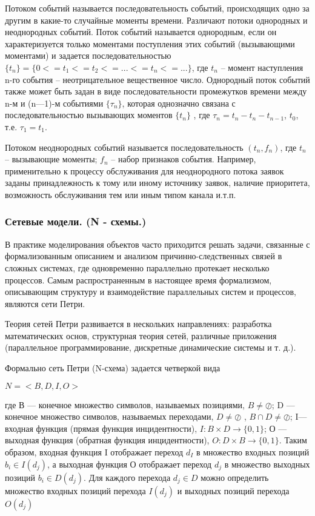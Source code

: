   Потоком событий называется последовательность событий, происходящих одно за другим в какие-то случайные моменты времени. Различают потоки однородных и неоднородных событий. Поток событий называется однородным, если он характеризуется только моментами поступления этих событий (вызывающими моментами) и задается последовательностью $\{t_{n}\} = \{0 <= t_{1} <= t_{2} <= ... <= t_{n} <= ...\}$, где $t_{n}$ -- момент наступления n-го события -- неотрицательное вещественное число. Однородный поток событий также может быть задан в виде последовательности промежутков времени между n-м и (n—1)-м событиями $\{\tau_{n}\}$, которая однозначно связана с последовательностью вызывающих моментов $\{t_{n}\}$ , где $\tau_{n} = t_{n} - t_{n} - t_{n-1}$, $t_{0}$, т.е. $\tau_{1} = t_{1}$.

  Потоком неоднородных событий называется последовательность $(t_{n}, f_{n})$, где $t_{n}$ -- вызывающие моменты; $f_{n}$ -- набор признаков события. Например, применительно к процессу обслуживания для неоднородного потока заявок заданы принадлежность к тому или иному источнику заявок, наличие приоритета, возможность обслуживания тем или иным типом канала и.т.п.

\subsubsection{Сетевые модели. (N - схемы.)}

  В практике моделирования объектов часто приходится решать задачи, связанные с формализованным описанием и анализом причинно-следственных связей в сложных системах, где одновременно параллельно протекает несколько процессов. Самым распространенным в настоящее время формализмом, описывающим структуру и взаимодействие параллельных систем и процессов, являются сети Петри.

  Теория сетей Петри развивается в нескольких направлениях: разработка математических основ, структурная теория сетей, различные приложения (параллельное программирование, дискретные динамические системы и т. д.).

  Формально сеть Петри (N-схема) задается четверкой вида

  \begin{center}
    $N = <B, D, I, O>$
  \end{center}

  где В — конечное множество символов, называемых позициями, $B \ne \oslash$; D — конечное множество символов, называемых переходами, $D \ne \oslash$ , $B \cap D \ne \oslash$; I—входная функция (прямая функция инцидентности), $I \colon B \times D\to \{0, 1\}$; О — выходная функция (обратная функция инцидентности), $O \colon D \times B \to \{0, 1\} $. Таким образом, входная функция I отображает переход $d_{I}$ в множество входных позиций $ b_{i} \in I(d_{j})$, а выходная функция О отображает переход $d_{j}$ в множество выходных позиций $b_{i} \in D(d_{j})$. Для каждого перехода $d_{j} \in D$ можно определить множество входных позиций перехода $I(d_{j})$ и выходных позиций перехода $O(d_{j})$

